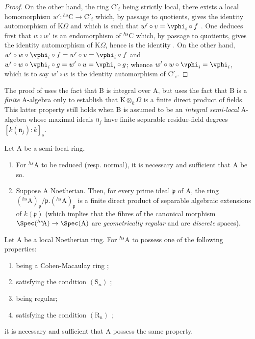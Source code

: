 \begin{proof}
On the other hand, the ring $\mathrm{C}'_i$ being strictly local, there exists a local homomorphism $w':{}^{hs}\!\mathrm{C}\to\mathrm{C}'_i$ which, by passage to quotients, gives the identity automorphism of $\mathrm{K}\Omega$ and which is such that $w'\circ v=\vphi_i\circ f$ .
One deduces first that $w\circ w'$ is an endomorphism of ${}^{hs}\!\mathrm{C}$ which, by passage to quotients, gives the identity automorphism of $\mathrm{K}\Omega$, hence
is the identity .
On the other hand, $w'\circ w\circ\vphi_i\circ f=w'\circ v=\vphi_i\circ f$ and $w'\circ w\circ\vphi_i\circ g=w'\circ u=\vphi_i\circ g$;
whence $w'\circ w\circ\vphi_i=\vphi_i$, which is to say $w'\circ w$ is the identity automorphism of $\mathrm{C}'_i$.
\end{proof}

\begin{remark}[18.8.11]
\label{IV.18.8.11}
The proof of  uses the fact that B is integral over A, but uses the fact that B is a \emph{finite} A-algebra only to establish that $\mathrm{K}\otimes_k\Omega$ is a finite direct product of fields.
This latter property still holds when B is assumed to be an \emph{integral semi-local} A-algebra whose maximal ideals $\mathfrak{n}_j$ have finite separable residue-field degrees $[k(\mathfrak{n}_j):k]_s$.
\end{remark}

\begin{proposition}[18.8.12]
\label{IV.18.8.12}
Let $\mathrm{A}$ be a semi-local ring.
\begin{enumerate}[label=\emph{\roman*)}]
  \item For ${}^{hs}\!\mathrm{A}$ to be reduced (resp. normal), it is necessary and sufficient that A be so.
  \item Suppose A Noetherian.
  Then, for every prime ideal $\mathfrak{p}$ of A, the ring $({}^{hs}\!\mathrm{A})_{\mathfrak{p}}/\mathfrak{p}.({}^{hs}\!\mathrm{A})_{\mathfrak{p}}$ is a finite direct product of separable algebraic extensions of $k(\mathfrak{p})$ (which implies that the fibres of the canonical morphism $\Spec({}^{hs}\!\mathrm{A})\to\Spec(\mathrm{A})$ are \emph{geometrically regular} and are \emph{discrete} spaces).
\end{enumerate}
\end{proposition}

\begin{corollary}[18.8.13]
\label{IV.18.8.13}
Let $\mathrm{A}$ be a local Noetherian ring.
For ${}^{hs}\!\mathrm{A}$ to possess one of the following properties:
\begin{enumerate}[label=\emph{\alph*)}]
  \item being a Cohen-Macaulay ring ;
  \item satisfying the condition $(\mathrm{S}_n)$ ;
  \item being regular;
  \item satisfying the condition $(\mathrm{R}_n)$ ;
\end{enumerate}
it is necessary and sufficient that A possess the same property.
\end{corollary}

